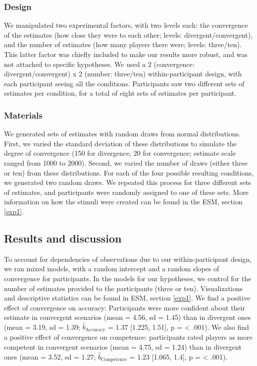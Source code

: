 \documentclass[
  doc,floatsintext]{apa6}
\begin{document}
\subsubsection{Design}\label{design}

We manipulated two experimental factors, with two levels each: the convergence of the estimates (how close they were to each other; levels: divergent/convergent), and the number of estimates (how many players there were; levels: three/ten). This latter factor was chiefly included to make our results more robust, and was not attached to specific hypotheses. We used a 2 (convergence: divergent/convergent) x 2 (number: three/ten) within-participant design, with each participant seeing all the conditions. Participants saw two different sets of estimates per condition, for a total of eight sets of estimates per participant.

\subsubsection{Materials}\label{materials}

We generated sets of estimates with random draws from normal distributions. First, we varied the standard deviation of these distributions to simulate the degree of convergence (150 for divergence, 20 for convergence; estimate scale ranged from 1000 to 2000). Second, we varied the number of draws (either three or ten) from these distributions. For each of the four possible resulting conditions, we generated two random draws. We repeated this process for three different sets of estimates, and participants were randomly assigned to one of these sets. More information on how the stimuli were created can be found in the ESM, section \ref{exp1}.

\subsection{Results and discussion}\label{results-and-discussion}

To account for dependencies of observations due to our within-participant design, we ran mixed models, with a random intercept and a random slopes of convergence for participants. In the models for our hypotheses, we control for the number of estimates provided to the participants (three or ten). Visualizations and descriptive statistics can be found in ESM, section \ref{exp1}. We find a positive effect of convergence on accuracy: Participants were more confident about their estimate in convergent scenarios (mean = 4.56, sd = 1.45) than in divergent ones (mean = 3.19, sd = 1.39; \(\hat{b}_{\text{Accuracy}}\) = 1.37 {[}1.225, 1.51{]}, p = \textless{} .001). We also find a positive effect of convergence on competence: participants rated players as more competent in convergent scenarios (mean = 4.75, sd = 1.24) than in divergent ones (mean = 3.52, sd = 1.27; \(\hat{b}_{\text{Competence}}\) = 1.23 {[}1.065, 1.4{]}, p = \textless{} .001).
\end{document}
